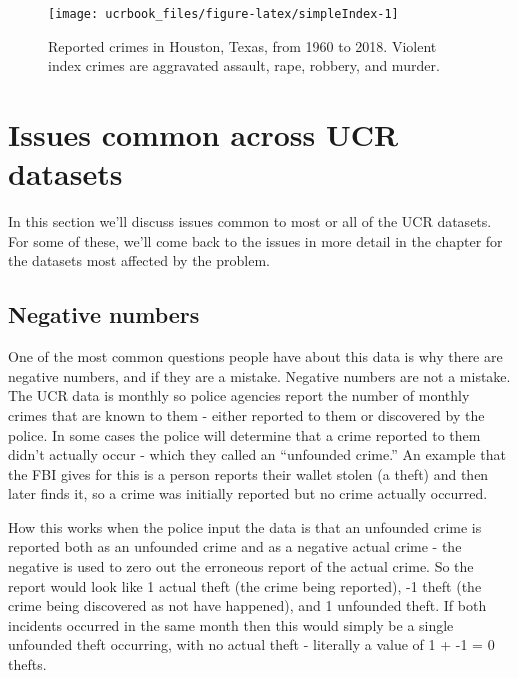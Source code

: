 \documentclass[
  12pt,
  openany]{book}
\begin{document}
\begin{figure}

{\centering \texttt{[image: ucrbook\_files/figure-latex/simpleIndex-1]} 

}

\caption{Reported crimes in Houston, Texas, from 1960 to 2018. Violent index crimes are aggravated assault, rape, robbery, and murder.}\label{fig:simpleIndex}
\end{figure}

\hypertarget{issues-common-across-ucr-datasets}{%
\section{Issues common across UCR datasets}\label{issues-common-across-ucr-datasets}}

In this section we'll discuss issues common to most or all of the UCR datasets. For some of these, we'll come back to the issues in more detail in the chapter for the datasets most affected by the problem.

\hypertarget{negative-numbers}{%
\subsection{Negative numbers}\label{negative-numbers}}

One of the most common questions people have about this data is why there are negative numbers, and if they are a mistake. Negative numbers are not a mistake. The UCR data is monthly so police agencies report the number of monthly crimes that are known to them - either reported to them or discovered by the police. In some cases the police will determine that a crime reported to them didn't actually occur - which they called an ``unfounded crime.'' An example that the FBI gives for this is a person reports their wallet stolen (a theft) and then later finds it, so a crime was initially reported but no crime actually occurred.

How this works when the police input the data is that an unfounded crime is reported both as an unfounded crime and as a negative actual crime - the negative is used to zero out the erroneous report of the actual crime. So the report would look like 1 actual theft (the crime being reported), -1 theft (the crime being discovered as not have happened), and 1 unfounded theft. If both incidents occurred in the same month then this would simply be a single unfounded theft occurring, with no actual theft - literally a value of 1 + -1 = 0 thefts.
\end{document}
